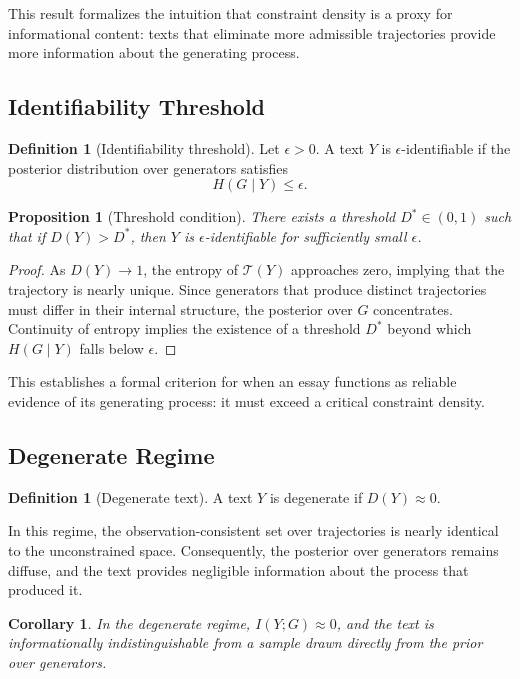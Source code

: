 \documentclass[12pt, oneside]{article}
\theoremstyle{plain}
\newtheorem{proposition}[theorem]{Proposition}
\newtheorem{corollary}[theorem]{Corollary}
\theoremstyle{definition}
\newtheorem{definition}[theorem]{Definition}
\theoremstyle{remark}
\begin{document}
This result formalizes the intuition that constraint density is a proxy for
informational content: texts that eliminate more admissible trajectories provide
more information about the generating process.

\subsection{Identifiability Threshold}

\begin{definition}[Identifiability threshold]
Let $\epsilon > 0$. A text $Y$ is $\epsilon$-identifiable if the posterior
distribution over generators satisfies
\[
  H(G \mid Y) \leq \epsilon.
\]
\end{definition}

\begin{proposition}[Threshold condition]
There exists a threshold $D^* \in (0,1)$ such that if $D(Y) > D^*$, then $Y$
is $\epsilon$-identifiable for sufficiently small $\epsilon$.
\end{proposition}

\begin{proof}
As $D(Y) \to 1$, the entropy of $\mathcal{T}(Y)$ approaches zero, implying that
the trajectory is nearly unique. Since generators that produce distinct trajectories
must differ in their internal structure, the posterior over $G$ concentrates.
Continuity of entropy implies the existence of a threshold $D^*$ beyond which
$H(G \mid Y)$ falls below $\epsilon$.
\end{proof}

This establishes a formal criterion for when an essay functions as reliable
evidence of its generating process: it must exceed a critical constraint density.

\subsection{Degenerate Regime}

\begin{definition}[Degenerate text]
A text $Y$ is degenerate if $D(Y) \approx 0$.
\end{definition}

In this regime, the observation-consistent set over trajectories is nearly identical
to the unconstrained space. Consequently, the posterior over generators remains
diffuse, and the text provides negligible information about the process that
produced it.

\begin{corollary}
In the degenerate regime, $I(Y; G) \approx 0$, and the text is informationally
indistinguishable from a sample drawn directly from the prior over generators.
\end{corollary}
\end{document}
